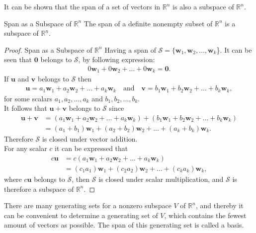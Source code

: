 \noindent It can be shown that the span of a set of vectors in $\mathbb{R}^n$ is also a subspace of $\mathbb{R}^n$.
\begin{theorem}{Span as a Subspace of $\mathbb{R}^n$}
The span of a definite nonempty subset of $\mathbb{R}^n$ is a subspace of $\mathbb{R}^n$.
\cite[231]{LiAl}
\end{theorem}
\begin{proof}{Span as a Subspace of $\mathbb{R}^n$}
   Having a span of $\mathcal{S} = \{\mathbf{w}_1, \mathbf{w}_2, \hdots, \mathbf{w}_k$\}. It can be seen that $\mathbf{0}$ belongs to $\mathcal{S}$, by following expression:
    \begin{align*}
        0\mathbf{w}_1 + 0\mathbf{w}_2 + \hdots + 0\mathbf{w}_k = \mathbf{0}.
    \end{align*}
    If $\mathbf{u}$ and $\mathbf{v}$ belongs to $\mathcal{S}$ then
    \begin{align*}
      \mathbf{u} = a_1\mathbf{w}_1 + a_2 \mathbf{w}_2 + \hdots + a_k\mathbf{w}_k \quad \text{and} \quad \mathbf{v} = b_1\mathbf{w}_1 + b_2 \mathbf{w}_2 + \hdots + b_k\mathbf{w}_k,  
    \end{align*}
    for some scalars $a_1, a_2, \hdots, a_k$ and $b_1, b_2, \hdots, b_k$.\\ It follows that $\mathbf{u}+\mathbf{v}$ belongs to $\mathcal{S}$ since 
    \begin{align*}
     \mathbf{u}+\mathbf{v} &= (a_1\mathbf{w}_1 + a_2 \mathbf{w}_2 + \hdots + a_k\mathbf{w}_k) + (b_1\mathbf{w}_1 + b_2 \mathbf{w}_2 + \hdots + b_k\mathbf{w}_k)\\ 
     &= (a_1+b_1)\mathbf{w}_1 + (a_2+b_2)\mathbf{w}_2 + \hdots + (a_k+b_k)\mathbf{w}_k.
     \end{align*}
     Therefore $\mathcal{S}$ is closed under vector addition.\\ For any scalar $c$ it can be expressed that 
     \begin{align*}
         c\mathbf{u} &= c(a_1\mathbf{w}_1 + a_2 \mathbf{w}_2 + \hdots + a_k\mathbf{w}_k)\\
         &=(c_1a_1)\mathbf{w}_1 + (c_2a_2)\mathbf{w}_2 + \hdots + (c_ka_k)\mathbf{w}_k,
     \end{align*}
     where $c\mathbf{u}$ belongs to $\mathcal{S}$, then $\mathcal{S}$ is closed under scalar multiplication, and $\mathcal{S}$ is therefore a subspace of $\mathbb{R}^n$.\cite[231]{LiAl} \qedsymbol
\end{proof}
\noindent There are many generating sets for a nonzero subspace $V$ of $\mathbb{R}^n$, and thereby it can be convenient to determine a generating set of $V$, which contains the fewest amount of vectors as possible. The span of this generating set is called a basis.
